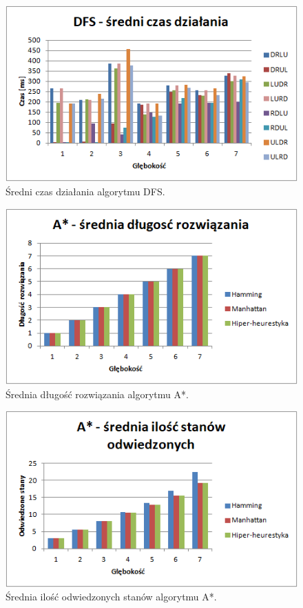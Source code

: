 \documentclass{classrep}
\begin{document}
\begin{figure}[H]
	\centering
		\includegraphics[width=1\textwidth]{Wykresy/10.png}
	\caption{Średni czas działania algorytmu DFS.}
\end{figure}
\begin{figure}[H]
	\centering
		\includegraphics[width=1\textwidth]{Wykresy/11.png}
	\caption{Średnia długość rozwiązania algorytmu A*.}
\end{figure}
\begin{figure}[H]
	\centering
		\includegraphics[width=1\textwidth]{Wykresy/12.png}
	\caption{Średnia ilość odwiedzonych stanów algorytmu A*.}
\end{figure}
\end{document}
